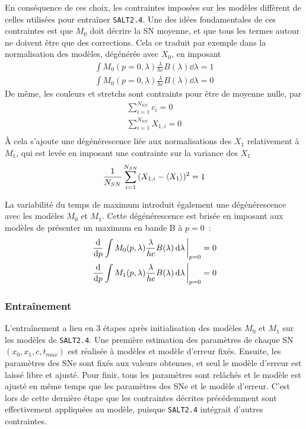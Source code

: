 \documentclass{book}
\begin{document}
En conséquence de ces choix, les contraintes imposées sur les modèles diffèrent de celles utilisées pour entraîner \verb|SALT2.4|. Une des idées fondamentales de ces contraintes est que $M_0$ doit décrire la SN moyenne, et que tous les termes autour ne doivent être que des corrections. Cela ce traduit par exemple dans la normalisation des modèles, dégénérée avec $X_0$, en imposant
\begin{gather}
	\int M_0(p=0,\lambda) \frac{\lambda}{hc} B(\lambda) \dd{\lambda} = 1\\
	\int M_0(p=0,\lambda) \frac{\lambda}{hc} B(\lambda) \dd{\lambda} = 0
\end{gather}
De même, les couleurs et stretchs sont contraints pour être de moyenne nulle, par
\begin{gather}
	\sum_{i=1}^{N_{SN}} c_i = 0\\
	\sum_{i=1}^{N_{SN}} X_{1,i} = 0\\
\end{gather}
À cela s'ajoute une dégénérescence liée aux normalisations des $X_1$ relativement à $M_1$, qui est levée en imposant une contrainte sur la variance des $X_1$
\begin{gather}
	\frac{1}{N_{SN}} \sum_{i=1}^{N_{SN}} (X_{1,i} - \ev{X_1})^2 = 1
\end{gather}

La variabilité du temps de maximum introduit également une dégénérescence avec les modèles $M_0$ et $M_1$. Cette dégénérescence est brisée en imposant aux modèles de présenter un maximum en bande B à $p=0$~:
\begin{gather}
	\eval{\dv{p} \int M_0(p,\lambda) \frac{\lambda}{hc} B(\lambda) \dd{\lambda}}_{p=0} = 0\\
	\eval{\dv{p} \int M_1(p,\lambda) \frac{\lambda}{hc} B(\lambda) \dd{\lambda}}_{p=0} = 0
\end{gather}

 \subsubsection{Entraînement}

L'entraînement a lieu en 3 étapes après initialisation des modèles $M_0$ et $M_1$ sur les modèles de \verb|SALT2.4|. Une première estimation des paramètres de chaque SN $(x_0, x_1, c, t_{max})$ est réalisée à modèles et modèle d'erreur fixés. Ensuite, les paramètres des SNe sont fixés aux valeurs obtenues, et seul le modèle d'erreur est laissé libre et ajusté. Pour finir, tous les paramètres sont relâchés et le modèle est ajusté en même temps que les paramètres des SNe et le modèle d'erreur. C'est lors de cette dernière étape que les contraintes décrites précédemment sont effectivement appliquées au modèle, puisque \verb|SALT2.4| intégrait d'autres contraintes.
\end{document}
